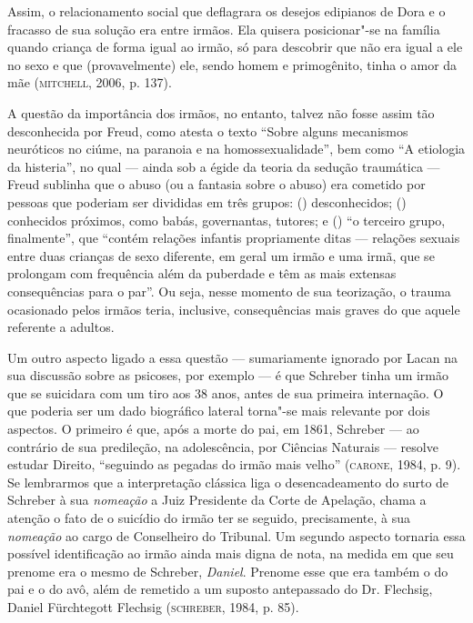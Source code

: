 Assim, o relacionamento social que deflagrara os desejos edipianos de
Dora e o fracasso de sua solução era entre irmãos. Ela quisera
posicionar"-se na família quando criança de forma igual ao irmão, só para
descobrir que não era igual a ele no sexo e que (provavelmente) ele,
sendo homem e primogênito, tinha o amor da mãe (\textsc{mitchell}, 2006, p. 137).

A questão da importância dos irmãos, no entanto, talvez não fosse assim
tão desconhecida por Freud, como atesta o texto ``Sobre alguns
mecanismos neuróticos no ciúme, na paranoia e na homossexualidade'',
bem como ``A etiologia da histeria'', no qual --- ainda sob a égide da
teoria da sedução traumática --- Freud sublinha que o abuso (ou a
fantasia sobre o abuso) era cometido por pessoas que poderiam ser
divididas em três grupos: () desconhecidos; () conhecidos próximos,
como babás, governantas, tutores; e () ``o terceiro grupo, finalmente'',
que ``contém relações infantis propriamente ditas --- relações sexuais
entre duas crianças de sexo diferente, em geral um irmão e uma irmã, que
se prolongam com frequência além da puberdade e têm as mais extensas
consequências para o par''. Ou seja, nesse momento de sua teorização, o
trauma ocasionado pelos irmãos teria, inclusive, consequências mais
graves do que aquele referente a adultos.

Um outro aspecto ligado a essa questão --- sumariamente ignorado por
Lacan na sua discussão sobre as psicoses, por exemplo --- é que Schreber
tinha um irmão que se suicidara com um tiro aos 38 anos, antes de sua
primeira internação. O que poderia ser um dado biográfico lateral
torna"-se mais relevante por dois aspectos. O primeiro é que, após a
morte do pai, em 1861, Schreber --- ao contrário de sua predileção, na
adolescência, por Ciências Naturais --- resolve estudar Direito,
``seguindo as pegadas do irmão mais velho'' (\textsc{carone}, 1984, p. 9). Se
lembrarmos que a interpretação clássica liga o desencadeamento do surto
de Schreber à sua \emph{nomeação} a Juiz Presidente da Corte de
Apelação, chama a atenção o fato de o suicídio do irmão ter se seguido,
precisamente, à sua \emph{nomeação} ao cargo de Conselheiro do Tribunal.
Um segundo aspecto tornaria essa possível identificação ao irmão ainda
mais digna de nota, na medida em que seu prenome era o mesmo de
Schreber, \emph{Daniel}. Prenome esse que era também o do pai e o do
avô, além de remetido a um suposto antepassado do Dr. Flechsig, Daniel
Fürchtegott Flechsig (\textsc{schreber}, 1984, p. 85).

